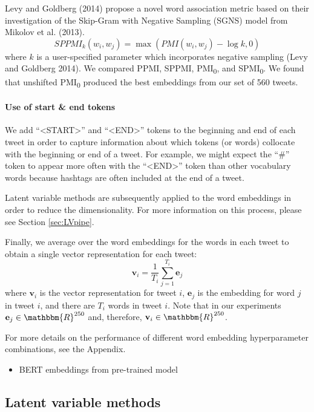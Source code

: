 \documentclass{article}
\begin{document}
Levy and Goldberg (2014) propose a novel word association metric based
on their investigation of the Skip-Gram with Negative Sampling (SGNS)
model from Mikolov et al. (2013).
\[SPPMI_k(w_i, w_j) = \max(PMI(w_i, w_j) - \log k, 0)\] where \(k\) is a
user-specified parameter which incorporates negative sampling (Levy and
Goldberg 2014). We compared PPMI, SPPMI, PMI\textsubscript{0}, and
SPMI\textsubscript{0}. We found that unshifted PMI\textsubscript{0}
produced the best embeddings from our set of 560 tweets.

\hypertarget{use-of-start-end-tokens}{%
\paragraph{Use of start \& end tokens}\label{use-of-start-end-tokens}}

We add ``\textless START\textgreater{}'' and
``\textless END\textgreater{}'' tokens to the beginning and end of each
tweet in order to capture information about which tokens (or words)
collocate with the beginning or end of a tweet. For example, we might
expect the ``\#'' token to appear more often with the
``\textless END\textgreater{}'' token than other vocabulary words
because hashtags are often included at the end of a tweet.

Latent variable methods are subsequently applied to the word embeddings
in order to reduce the dimensionality. For more information on this
process, please see Section \ref{sec:LVpipe}.

Finally, we average over the word embeddings for the words in each tweet
to obtain a single vector representation for each tweet:
\[\mathbf{v}_i=\frac {1} {T_i} \sum_{j=1}^{T_i}{\mathbf{e}_j}\] where
\(\mathbf{v}_i\) is the vector representation for tweet \(i\),
\(\mathbf{e}_j\) is the embedding for word \(j\) in tweet \(i\), and
there are \(T_i\) words in tweet \(i\). Note that in our experiments
\(\mathbf{e}_j \in \mathbbm{R}^{250}\) and, therefore,
\(\mathbf{v}_i \in \mathbbm{R}^{250}\).

For more details on the performance of different word embedding
hyperparameter combinations, see the Appendix.

\begin{itemize}
\tightlist
\item
  BERT embeddings from pre-trained model
\end{itemize}

\hypertarget{latent-variable-methods}{%
\subsection{Latent variable methods}\label{latent-variable-methods}}
\end{document}
